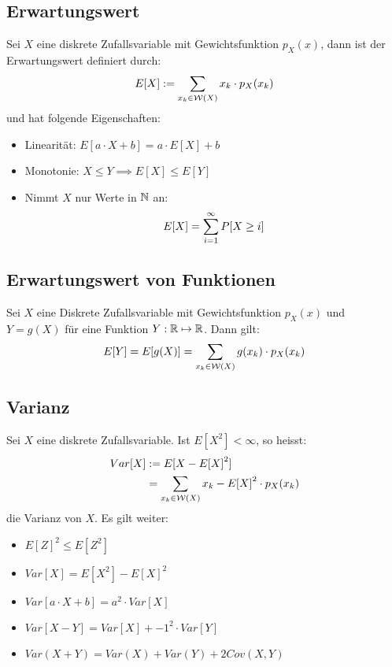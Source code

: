 \subsection*{Erwartungswert}
Sei $X$ eine diskrete Zufallsvariable mit Gewichtsfunktion $p_X (x)$, dann ist
der Erwartungswert definiert durch:
\begin{align*}
  E[X] := \sum_{x_k \in \mathcal{W} (X)} x_k \cdot p_X (x_k)
\end{align*}
und hat folgende Eigenschaften:
\begin{itemize}
  \item Linearität: $E[a \cdot X + b] = a \cdot E[X] + b$
  \item Monotonie: $X \leq Y \implies E[X] \leq E[Y]$
  \item Nimmt $X$ nur Werte in $\mathbb{N} $ an:
        \begin{align*}
          E[X] = \sum_{i = 1}^\infty P[X \geq i]
        \end{align*}
\end{itemize}
\subsection*{Erwartungswert von Funktionen}
Sei $X$ eine Diskrete Zufallsvariable mit Gewichtsfunktion $p_X (x)$ und $Y = g
  (X)$ für eine Funktion $Y: \mathbb{R} \mapsto \mathbb{R}$. Dann gilt:
\begin{align*}
  E[Y] = E[g (X)] = \sum_{x_k \in \mathcal{W} (X)} g (x_k) \cdot p_X (x_k)
\end{align*}
\subsection*{Varianz}
Sei $X$ eine diskrete Zufallsvariable. Ist $E[X^2] < \infty$, so heisst:
\begin{align*}
  Var[X] & := E[ {X - E[X]}^2]                                     \\
         & = \sum_{x_k \in \mathcal{W} (X)}  {x_k - E[X]}^2 \cdot p_X (x_k)
\end{align*}
die Varianz von $X$. Es gilt weiter:
\begin{itemize}
  \item $E[Z]^2 \leq E[Z^2]$
  \item $Var[X] = E[X^2] - {E[X]}^2$
  \item $Var[a \cdot X + b] = a^2 \cdot Var[X]$
  \item $Var[X - Y] = Var[X] +  {-1}^2 \cdot Var[Y]$
  \item $Var(X+Y) = Var(X) + Var(Y) + 2Cov(X,Y)$
\end{itemize}
